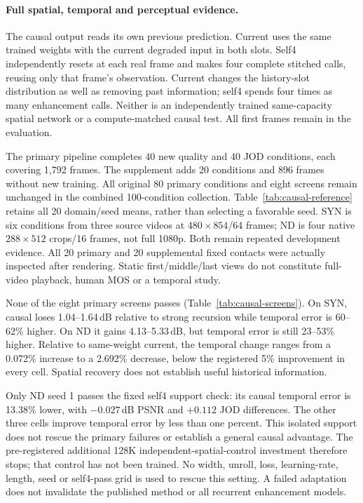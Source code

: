 \paragraph{Full spatial, temporal and perceptual evidence.}

The causal output reads its own previous prediction. Current uses
the same trained weights with the current degraded input in both slots.
Self4 independently resets at each real frame and makes four complete
stitched calls, reusing only that frame's observation. Current changes
the history-slot distribution as well as removing past information;
self4 spends four times as many enhancement calls. Neither is an
independently trained same-capacity spatial network or a compute-matched
causal test. All first frames remain in the evaluation.

The primary pipeline completes 40 new quality and 40 JOD conditions,
each covering 1,792 frames. The supplement adds 20 conditions
and 896 frames without new training. All original 80 primary conditions
and eight screens remain unchanged in the combined 100-condition
collection. Table~\ref{tab:causal-reference} retains all 20 domain/seed
means, rather than selecting a favorable seed. SYN is six conditions
from three source videos at $480\times854$/64 frames; ND is four native
$288\times512$ crops/16 frames, not full 1080p. Both remain repeated
development evidence. All 20 primary and 20 supplemental fixed contacts
were actually inspected after rendering. Static first/middle/last views
do not constitute full-video playback, human MOS or a temporal study.


None of the eight primary screens passes
(Table~\ref{tab:causal-screens}). On SYN, causal loses 1.04--1.64\,dB
relative to strong recursion while temporal error is 60--62\% higher.
On ND it gains 4.13--5.33\,dB, but temporal error is still 23--53\%
higher. Relative to same-weight current, the temporal change ranges
from a 0.072\% increase to a 2.692\% decrease, below the registered
5\% improvement in every cell. Spatial recovery does not establish
useful historical information.

Only ND seed 1 passes the fixed self4 support check: its causal
temporal error is 13.38\% lower, with $-0.027$\,dB PSNR and
$+0.112$ JOD differences. The other three cells improve temporal
error by less than one percent. This isolated support does not rescue
the primary failures or establish a general causal advantage. The
pre-registered additional 128K independent-spatial-control investment
therefore stops; that control has not been trained. No width, unroll,
loss, learning-rate, length, seed or self4-pass grid is used to rescue
this setting. A failed adaptation does not invalidate the published
method or all recurrent enhancement models.

